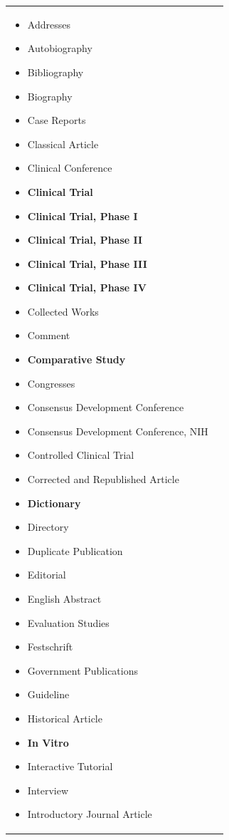 \documentclass[11pt,twoside,a4paper]{article}
\begin{document}
\begin{table}[ht]
	\begin{center}
		\begin{tabular}{|p{}|p{}|}
		\hline
		\begin{itemize}
			\item Addresses
			\item Autobiography
			\item Bibliography
			\item Biography
			\item Case Reports
			\item Classical Article
			\item Clinical Conference
			\item \textbf{Clinical Trial}
			\item \textbf{Clinical Trial, Phase I}
			\item \textbf{Clinical Trial, Phase II}
			\item \textbf{Clinical Trial, Phase III}
			\item \textbf{Clinical Trial, Phase IV}
			\item Collected Works
			\item Comment
			\item \textbf{Comparative Study}
			\item Congresses
			\item Consensus Development Conference
			\item Consensus Development Conference, NIH
			\item Controlled Clinical Trial
			\item Corrected and Republished Article
			\item \textbf{Dictionary}
			\item Directory
			\item Duplicate Publication
			\item Editorial
			\item English Abstract
			\item Evaluation Studies
			\item Festschrift
			\item Government Publications
			\item Guideline
			\item Historical Article
			\item \textbf{In Vitro}
			\item Interactive Tutorial
			\item Interview
			\item Introductory Journal Article

\end{itemize}
\end{tabular}
\end{center}
\end{table}
\end{document}

